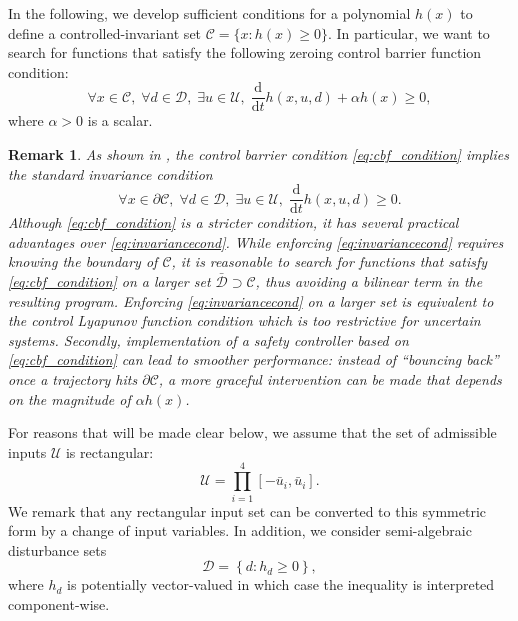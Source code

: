\documentclass[conference]{IEEEtran}
\newtheorem{remark}{Remark}
\begin{document}
In the following, we develop sufficient conditions for a polynomial $h(x)$ to define a controlled-invariant set $\mathcal C = \{ x : h(x) \geq 0 \}$. In particular, we want to search for functions that satisfy the following zeroing control barrier function condition:
\begin{equation}
\label{eq:cbf_condition}
   \forall x \in \mathcal C, \;  \forall d \in \mathcal D, \; \exists u \in \mathcal U, \; \frac{\mathrm{d}}{\mathrm{d}t} h(x,u,d) + \alpha h(x) \geq 0,
 \end{equation} 
where $\alpha > 0$ is a scalar.
\begin{remark}
  As shown in \cite{Ames2017}, the control barrier condition \eqref{eq:cbf_condition} implies the standard invariance condition
  \begin{equation}
  \label{eq:invariancecond}
    \forall x \in \partial \mathcal C, \;  \forall d \in \mathcal D, \; \exists u \in \mathcal U, \; \frac{\mathrm{d}}{\mathrm{d}t} h(x,u,d)  \geq 0.
  \end{equation}
  Although \eqref{eq:cbf_condition} is a stricter condition, it has several practical advantages over \eqref{eq:invariancecond}. While enforcing \eqref{eq:invariancecond} requires knowing the boundary of $\mathcal C$, it is reasonable to search for functions that satisfy \eqref{eq:cbf_condition} on a larger set $\bar {\mathcal D} \supset \mathcal C$, thus avoiding a bilinear term in the resulting program. Enforcing \eqref{eq:invariancecond} on a larger set is equivalent to the control Lyapunov function condition which is too restrictive for uncertain systems. Secondly, implementation of a safety controller based on \eqref{eq:cbf_condition} can lead to smoother performance: instead of ``bouncing back'' once a trajectory hits $\partial \mathcal C$, a more graceful intervention can be made that depends on the magnitude of $\alpha h(x)$.
\end{remark}
 For reasons that will be made clear below, we assume that the set of admissible inputs $\mathcal U$ is rectangular:
 \begin{equation}
   \mathcal U = \prod_{i=1}^4 [-\bar u_i, \bar u_i].
 \end{equation}
 We remark that any rectangular input set can be converted to this symmetric form by a change of input variables. In addition, we consider semi-algebraic disturbance sets
\begin{equation}
  \mathcal D = \left\{ d : h_d \geq 0 \right\},
\end{equation}
where $h_d$ is potentially vector-valued in which case the inequality is interpreted component-wise.
\end{document}
